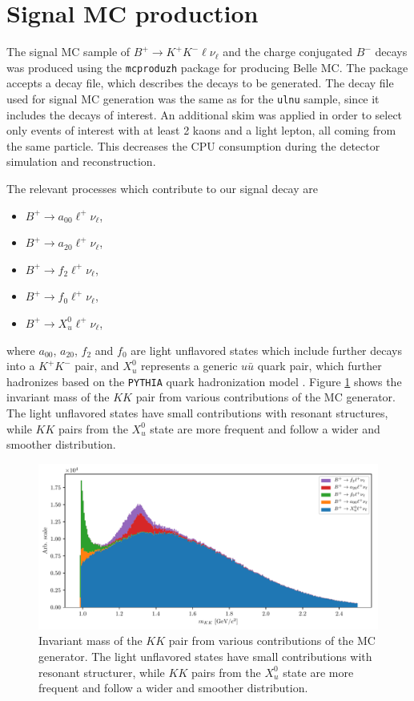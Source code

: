 \section{Signal MC production}

The signal MC sample of $B^+ \to K^+ K^- \ell \nu_\ell$ and the charge conjugated $B^-$ decays was produced using the \texttt{mcproduzh} package for producing Belle MC. The package accepts a decay file, which describes the decays to be generated. The decay file used for signal MC generation was the same as for the \texttt{ulnu} sample, since it includes the decays of interest. An additional skim was applied in order to select only events of interest with at least 2 kaons and a light lepton, all coming from the same particle. This decreases the CPU consumption during the detector simulation and reconstruction.

The relevant processes which contribute to our signal decay are
\begin{itemize}
\item $B^+ \to a_{00} \ell^+ \nu_\ell$,
\item $B^+ \to a_{20} \ell^+ \nu_\ell$,
\item $B^+ \to f_{2} \ell^+ \nu_\ell$,
\item $B^+ \to f_{0} \ell^+ \nu_\ell$,
\item $B^+ \to X_{u}^0 \ell^+ \nu_\ell$,
\end{itemize}
where $a_{00}$, $a_{20}$, $f_{2}$ and $f_{0}$ are light unflavored states which include further decays into a $K^+K^-$ pair, and $X_u^0$ represents a generic $u \bar u$ quark pair, which further hadronizes based on the \texttt{PYTHIA} quark hadronization model \cite{sjostrand2006pythia}. %
Figure \ref{fig:KKsrc} shows the invariant mass of the $KK$ pair from various contributions of the MC generator. The light unflavored states have small contributions with resonant structures, while $KK$ pairs from the $X_u^0$ state are more frequent and follow a wider and smoother distribution.

\begin{figure}[H]
\centering
\includegraphics[width=\linewidth]{fig/KKlnu_src}
\captionsetup{width=.8\linewidth}
\caption{Invariant mass of the $KK$ pair from various contributions of the MC generator. The light unflavored states have small contributions with resonant structurer, while $KK$ pairs from the $X_u^0$ state are more frequent and follow a wider and smoother distribution.}
\label{fig:KKsrc}
\end{figure}

